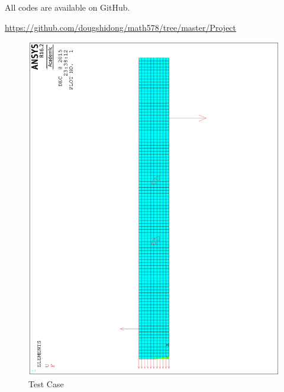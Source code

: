 \documentclass[letterpaper,12pt,]{article}
\begin{document}
All codes are available on GitHub.

\url{https://github.com/dougshidong/math578/tree/master/Project}
\begin{landscape}
\newpage
\begin{figure}[h]
\centering
\includegraphics[width=1.0\textwidth,angle=-90]{tcase000.eps}
\caption{Test Case}
\label{fig:case1}
\end{figure}


\end{landscape}
\end{document}
